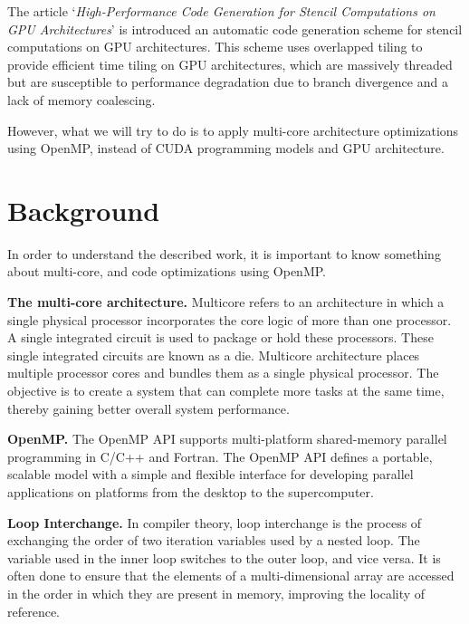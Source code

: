 \documentclass[conference]{IEEEtran}
\newcommand{\mypar}[1]{{\bf #1.}}
\begin{document}
The article `\textit{High-Performance Code Generation for Stencil Computations on GPU Architectures}' \cite{holewinski-pouchet-sadayappan}  is introduced an automatic code generation scheme for stencil computations on GPU architectures. This scheme uses overlapped tiling to provide efficient time tiling on GPU architectures, which are massively threaded but are susceptible to performance degradation due to branch divergence and a lack of memory coalescing. 

However, what we will try to do is to apply multi-core architecture optimizations using OpenMP, instead of CUDA programming models and GPU architecture.

\section{Background}\label{sec:background}

In order to understand the described work, it is important to know something about multi-core, and code optimizations using OpenMP.

\mypar{The multi-core architecture}
Multicore refers to an architecture in which a single physical processor incorporates the core logic of more than one processor. A single integrated circuit is used to package or hold these processors. These single integrated circuits are known as a die. Multicore architecture places multiple processor cores and bundles them as a single physical processor. The objective is to create a system that can complete more tasks at the same time, thereby gaining better overall system performance. \cite{techopedia}

\mypar{OpenMP}
The OpenMP API supports multi-platform shared-memory parallel programming in C/C++ and Fortran. The OpenMP API defines a portable, scalable model with a simple and flexible interface for developing parallel applications on platforms from the desktop to the supercomputer. \cite{openmp}

\mypar{Loop Interchange}
In compiler theory, loop interchange is the process of exchanging the order of two iteration variables used by a nested loop. The variable used in the inner loop switches to the outer loop, and vice versa. It is often done to ensure that the elements of a multi-dimensional array are accessed in the order in which they are present in memory, improving the locality of reference. \cite{loop-interchange}
\end{document}
